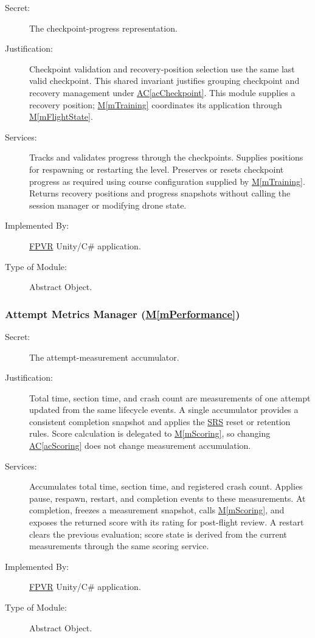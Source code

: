 \documentclass[12pt, titlepage]{article}
\DeclareRobustCommand{\mgabbr}[2]{\hyperlink{mg-abbr:#1}{#2}}
\newcommand{\acref}[1]{\mgabbr{ac}{AC}\ref{#1}}
\newcommand{\mref}[1]{\hyperref[#1]{M\ref*{#1}}}
\begin{document}
\begin{description}

\item[Secret:]
The checkpoint-progress representation.

\item[Justification:]
Checkpoint validation and recovery-position selection use the same last
valid checkpoint. This shared invariant justifies grouping checkpoint and
recovery management under \acref{acCheckpoint}. This module supplies a
recovery position; \mref{mTraining} coordinates its application through
\mref{mFlightState}.

\item[Services:]
Tracks and validates progress through the checkpoints. Supplies positions
for respawning or restarting the level. Preserves or resets checkpoint
progress as required using course configuration supplied by
\mref{mTraining}. Returns recovery positions and progress snapshots without
calling the session manager or modifying drone state.

\item[Implemented By:]
\mgabbr{fpvr}{FPVR} Unity/C\# application.

\item[Type of Module:]
Abstract Object.

\end{description}


\subsubsection{Attempt Metrics Manager
(\mref{mPerformance})}

\begin{description}

\item[Secret:]
The attempt-measurement accumulator.

\item[Justification:]
Total time, section time, and crash count are measurements of one attempt
updated from the same lifecycle events. A single accumulator provides a
consistent completion snapshot and applies the \mgabbr{srs}{SRS} reset or
retention
rules. Score calculation is delegated to \mref{mScoring}, so changing
\acref{acScoring} does not change measurement accumulation.

\item[Services:]
Accumulates total time, section time, and registered crash count.
Applies pause, respawn, restart, and completion events to these measurements.
At completion, freezes a measurement snapshot, calls \mref{mScoring},
and exposes the returned score with its rating for post-flight review.
A restart clears the previous evaluation; score state is derived from
the current measurements through the same scoring service.

\item[Implemented By:]
\mgabbr{fpvr}{FPVR} Unity/C\# application.

\item[Type of Module:]
Abstract Object.

\end{description}
\end{document}

